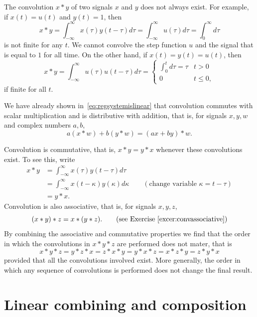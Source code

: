 \documentclass[11pt,a4paper]{book}
\theoremstyle{plain}
\numberwithin{equation}{section}
\newcommand{\reals}{{\mathbb R}}
\begin{document}
The convolution $x * y$ of two signals $x$ and $y$ does not always exist.  For example, if $x(t) = u(t)$ and $y(t) = 1$, then
\[
x * y = \int_{-\infty}^\infty x(\tau) y(t - \tau) d\tau = \int_{-\infty}^\infty u(\tau) d\tau = \int_{0}^\infty d\tau
\]
is not finite for any $t$.  We cannot convolve the step function $u$ and the signal that is equal to $1$ for all time.  On the other hand, if $x(t) = y(t) = u(t)$, then
\[
x * y = \int_{-\infty}^\infty u(\tau) u(t - \tau) d\tau =  \begin{cases}
\int_{0}^t d\tau  = \tau & t > 0 \\
0 & t \leq 0,
\end{cases}
\]
if finite for all $t$.  %

We have already shown in~\eqref{eq:regsystemislinear} that convolution commutes with scalar multiplication and is distributive with addition, that is, for signals $x,y,w$ and complex numbers $a,b$,
\[
a (x * w) + b (y * w) = (ax + by) * w.
\]

Convolution is commutative, that is, $x*y = y*x$ whenever these convolutions exist.  To see this, write
\begin{align*}
x*y &= \int_{-\infty}^\infty x(\tau) y(t - \tau) d\tau \\
&= \int_{-\infty}^\infty x(t - \kappa) y(\kappa) d\kappa \qquad (\text{change variable $\kappa = t - \tau$}) \\
&= y * x.
\end{align*}
Convolution is also associative, that is, for signals $x,y,z$, 
\[
(x*y)*z = x*(y*z). \qquad \text{(see Exercise~\ref{excer:convassociative})}
\]
By combining the associative and commutative properties we find that the order in which the convolutions in $x * y * z$ are performed does not mater, that is
\[
x*y*z = y*z*x = z*x*y = y*x*z = x*z*y = z*y*x
\]
provided that all the convolutions involved exist.  More generally, the order in which any sequence of convolutions is performed does not change the final result.

\section{Linear combining and composition}\label{sec:line-comb-comp}
\end{document}
